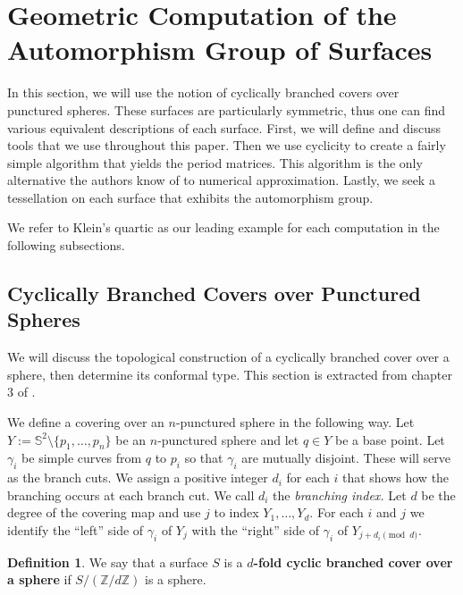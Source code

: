\documentclass[12pt,reqno]{amsart}
\theoremstyle{definition}
\newtheorem{defn}{Definition}
\theoremstyle{remark}
\begin{document}
\section{Geometric Computation of the Automorphism Group of Surfaces}
\label{sec:chap3}

In this section, we will use the notion of cyclically branched covers over punctured spheres. These surfaces are particularly symmetric, thus one can find various equivalent descriptions of each surface. First, we will define and discuss tools that we use throughout this paper. Then we use cyclicity to create a fairly simple algorithm that yields the period matrices. This algorithm is the only alternative the authors know of to numerical approximation. Lastly, we seek a tessellation on each surface that exhibits the automorphism group.

We refer to Klein's quartic as our leading example for each computation in the following subsections.


\subsection{Cyclically Branched Covers over Punctured Spheres}

We will discuss the topological construction of a cyclically branched cover over a sphere, then determine its conformal type. This section is extracted from chapter 3 of \cite{dthesis}.

We define a covering over an $n$-punctured sphere in the following way. Let $Y := \mathbb{S}^2 \setminus \{p_1, \ldots , p_n\}$ be an $n$-punctured sphere and let $q \in Y$ be a base point. Let $\gamma_i$ be simple curves from $q$ to $p_i$ so that $\gamma_i$ are mutually disjoint. These will serve as the branch cuts. We assign a positive integer $d_i$ for each $i$ that shows how the branching occurs at each branch cut. We call $d_i$ the \textit{branching index.} Let $d$ be the degree of the covering map and use $j$ to index $Y_1, \ldots , Y_d.$ For each $i$ and $j$ we identify the ``left'' side of $\gamma_i$ of $Y_j$ with the ``right'' side of $\gamma_i$ of $Y_{j + d_i \pmod d}.$ 

\begin{defn} We say that a surface $S$ is a \textbf{$d$-fold cyclic branched cover over a sphere} if $S/(\mathbb{Z}/ d \mathbb{Z})$ is a sphere.  \end{defn}
\end{document}
